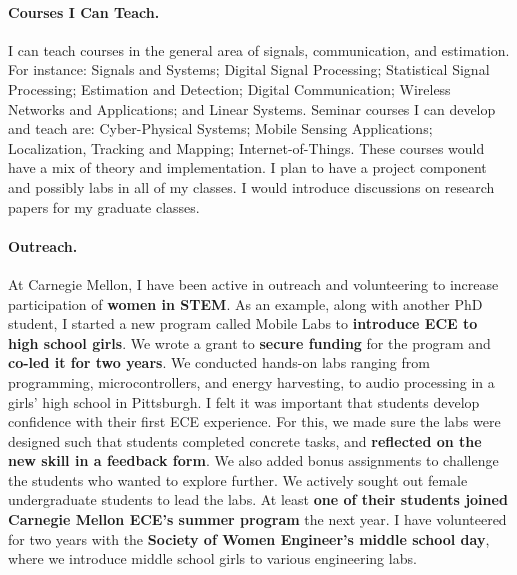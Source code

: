 \documentclass[10pt]{article}
\begin{document}
\paragraph{Courses I Can Teach. }
I can teach courses in the general area of signals, communication, and estimation. For instance: 
Signals and Systems; Digital Signal Processing; Statistical Signal Processing; Estimation and Detection; Digital Communication; Wireless Networks and Applications; and Linear Systems. 
Seminar courses I can develop and teach are: Cyber-Physical Systems; Mobile Sensing Applications; Localization, Tracking and Mapping; Internet-of-Things. These courses would have a mix of theory and implementation. I plan to have a project component and possibly labs in all of my classes. I would introduce discussions on research papers for my graduate classes.



 \paragraph{Outreach. } 
 At Carnegie Mellon, I have been active in outreach and volunteering to increase participation of \textbf{women in STEM}. %
As an example, along with another PhD student, I started a new program called Mobile Labs to \textbf{introduce ECE to high school girls}. We wrote a grant to \textbf{secure funding} for the program and \textbf{co-led it for two years}. We conducted hands-on labs ranging from programming, microcontrollers, and energy harvesting, to audio processing in a girls' high school in Pittsburgh. I felt it was important that students develop confidence with their first ECE experience. For this, we made sure the labs were designed such that students completed concrete tasks, and \textbf{reflected on the new skill in a feedback form}. We also added bonus assignments to challenge the students who wanted to explore further. We actively sought out female undergraduate students to lead the labs. At least \textbf{one of their students joined Carnegie Mellon ECE's summer program} the next year. I have volunteered for two years with the \textbf{Society of Women Engineer's middle school day}, where we introduce middle school girls to various engineering labs.\\
\end{document}
